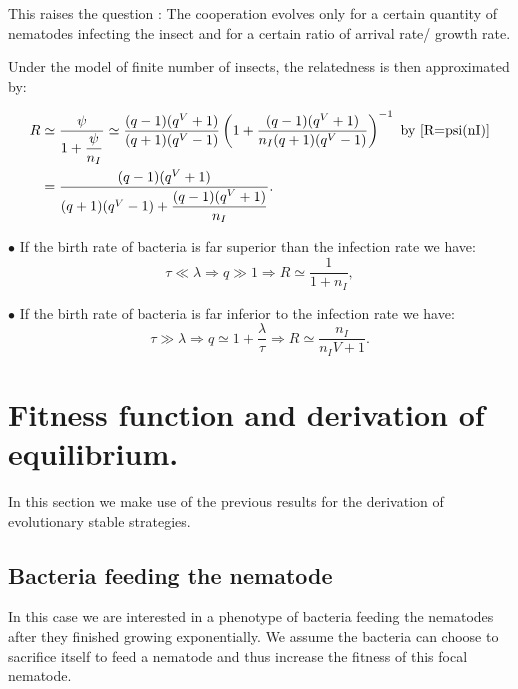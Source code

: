 \documentclass{article}
\begin{document}
  This raises the question : The cooperation evolves only for a certain quantity of nematodes infecting the insect and for a certain ratio of arrival rate/ growth rate.

Under the model of finite number of insects, the relatedness is then approximated by: 
 
 \begin{align}
  R & \simeq \dfrac{\psi}{1+ \dfrac{\psi}{n_{I}}} \simeq \dfrac{(q-1)(q^V +1)}{(q+1)(q^V -1)} \left( 1+ \dfrac{(q-1)(q^V +1)}{n_I (q+1)(q^V -1)} \right)^{-1} \text{ by }\ref{R=psi(nI)}\\
    &= \dfrac{(q-1)(q^V+1)}{ (q+1)(q^V -1)+ \dfrac{(q-1)(q^V +1)}{n_I}}.
 \end{align}
 
 
 $\bullet$ If the birth rate of bacteria is far superior than the infection rate we have:
 \begin{equation}
 \tau \ll \lambda \Rightarrow q \gg 1 \Rightarrow R \simeq \dfrac{1}{1+n_I},
 \end{equation}
 
 $\bullet$ If the birth rate of bacteria is far inferior to the infection rate we have:
 \begin{equation}
 \tau \gg \lambda \Rightarrow q \simeq 1 + \frac{\lambda }{\tau } \Rightarrow R \simeq \dfrac{n_I}{n_I V +1}.
 \end{equation}

 \section{Fitness function and derivation of equilibrium.}
 
 In this section we make use of the previous results for the derivation of evolutionary stable strategies.
 \subsection{Bacteria feeding the nematode}
 In this case we are interested in a phenotype of bacteria feeding the nematodes after they finished growing exponentially. We assume the bacteria can choose to sacrifice itself to feed a nematode and thus increase the fitness of this focal nematode.
 
\end{document}
